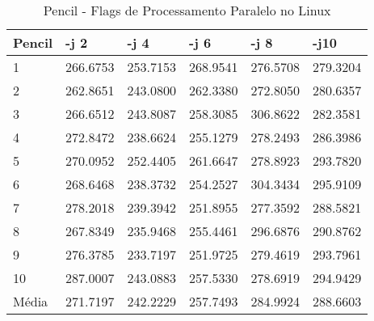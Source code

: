 \begin{table}[!ht]
\centering
\caption{Pencil - Flags de Processamento Paralelo no Linux}
\label{tab:flag_processamento_paralelo:linux:pencil}
\begin{tabular}{llllll}
\textbf{Pencil} & \textbf{-j 2} & \textbf{-j 4} & \textbf{-j 6} & \textbf{-j 8} & \textbf{-j10}  \\ \toprule
1                  & 266.6753  &   253.7153   &  268.9541 &    276.5708 &    279.3204       \\ 
2                  & 262.8651  &   243.0800   &  262.3380 &    272.8050 &    280.6357       \\ 
3                  & 266.6512  &   243.8087   &  258.3085 &    306.8622 &    282.3581       \\ 
4                  & 272.8472  &   238.6624   &  255.1279 &    278.2493 &    286.3986       \\ 
5                  & 270.0952  &   252.4405   &  261.6647 &    278.8923 &    293.7820       \\ 
6                  & 268.6468  &   238.3732   &  254.2527 &    304.3434 &    295.9109       \\ 
7                  & 278.2018  &   239.3942   &  251.8955 &    277.3592 &    288.5821       \\ 
8                  & 267.8349  &   235.9468   &  255.4461 &    296.6876 &    290.8762       \\ 
9                  & 276.3785  &   233.7197   &  251.9725 &    279.4619 &    293.7961       \\ 
10                 & 287.0007  &   243.0883   &  257.5330 &    278.6919 &    294.9429       \\ \bottomrule
Média              & 271.7197  &   242.2229   &  257.7493 &    284.9924 &    288.6603       \\ 
\end{tabular}
\end{table}

